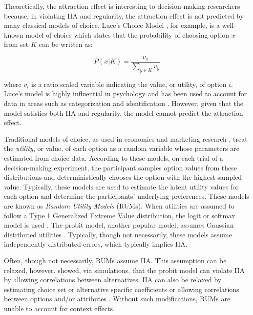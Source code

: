 Theoretically, the attraction effect is interesting to decision-making researchers because, in violating IIA and regularity, the attraction effect is not predicted by many classical models of choice. Luce's Choice Model \parencite{luce1959individual}, for example, is a well-known model of choice which states that the probability of choosing option $x$ from set $K$ can be written as:

\begin{equation}
    P(x|K) = \frac{v_{x}}{\sum_{y \in K} v_{y}}
\end{equation}

where $v_{i}$ is a ratio scaled variable indicating the value, or utility, of option $i$. Luce's model is highly influential in psychology and has been used to account for data in areas such as categorization \parencite{nosofskyAttentionSimilarityIdentificationCategorization1986} and identification \parencite{townsend1971theoretical}. However, given that the model satisfies both IIA and regularity, the model cannot predict the attraction effect. 

Traditional models of choice, as used in economics and marketing research \parencite{mcfadden2001economic}, treat the \textit{utility}, or value, of each option as a random variable whose parameters are estimated from choice data. According to these models, on each trial of a decision-making experiment, the participant samples option values from these distributions and deterministically chooses the option with the highest sampled value. Typically, these models are used to estimate the latent utility values for each option and determine the participants' underlying preferences. These models are known as \textit{Random Utility Models} (RUMs). When utilities are assumed to follow a Type 1 Generalized Extreme Value distribution, the logit or softmax model is used \parencite{gensch1979multinomial}. The probit model, another popular model, assumes Gaussian distributed utilities \parencite{mcfadden1980econometric}. Typically, though not necessarily, these models assume independently distributed errors, which typically implies IIA. 

Often, though not necessarily, RUMs assume IIA. This assumption can be relaxed, however. \textcite{paetzUtilityIndependenceIIA2018} showed, via simulations, that the probit model can violate IIA by allowing correlations between alternatives. IIA can also be relaxed by estimating choice set or alternative specific coefficients \parencite{rooderkerk2011incorporating} or allowing correlations between options and/or attributes \parencite{haaijer1998utility}. Without such modifications, RUMs are unable to account for context effects. 

